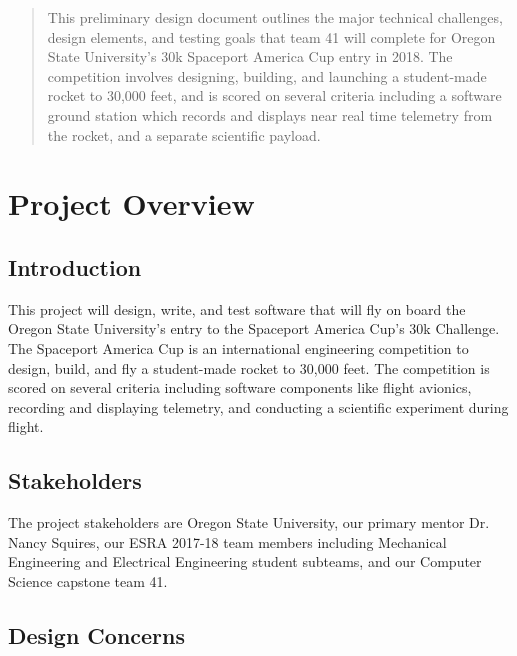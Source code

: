 \documentclass[onecolumn, draftclsnofoot, 10pt, compsoc]{IEEEtran}
\begin{document}
\begin{titlepage}
    \begin{abstract}
    This preliminary design document outlines the major technical challenges, design elements, and testing goals that team 41 will complete for Oregon State University's 30k Spaceport America Cup entry in 2018.  The competition involves designing, building, and launching a student-made rocket to 30,000 feet, and is scored on several criteria including a software ground station which records and displays near real time telemetry from the rocket, and a separate scientific payload.
	\end{abstract}
\end{titlepage}

\newpage



\tableofcontents


\section{Project Overview}

\subsection{Introduction}

This project will design, write, and test software that will fly on board the Oregon State University's entry to the Spaceport America Cup's 30k Challenge.  The Spaceport America Cup is an international engineering competition to design, build, and fly a student-made rocket to 30,000 feet.  The competition is scored on several criteria including software components like flight avionics, recording and displaying telemetry, and conducting a scientific experiment during flight.

\subsection{Stakeholders}

The project stakeholders are Oregon State University, our primary mentor Dr. Nancy Squires, our ESRA 2017-18 team members including Mechanical Engineering and Electrical Engineering student subteams, and our Computer Science capstone team 41.

\subsection{Design Concerns}
\end{document}
